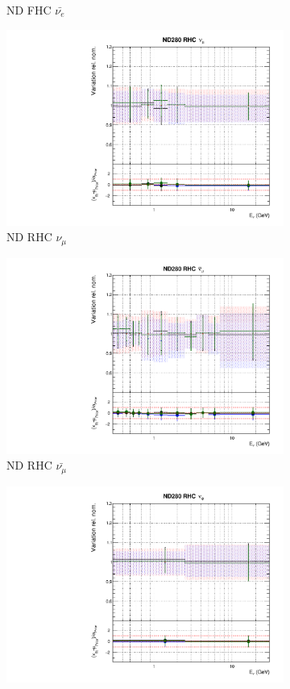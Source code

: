 \begin{figure}
\begin{subfigure}{0.45\textwidth}
  \caption{ND FHC $\bar{\nu_{e}}$}
\end{subfigure}
\begin{subfigure}{0.45\textwidth}
  \centering
  \includegraphics[width=0.75\linewidth]{figs/hptpcfitsflux_4}
  \caption{ND RHC $\nu_{\mu}$}
\end{subfigure}
\begin{subfigure}{0.45\textwidth}
  \centering
  \includegraphics[width=0.75\linewidth]{figs/hptpcfitsflux_5}
  \caption{ND RHC $\bar{\nu_{\mu}}$}
\end{subfigure}
\begin{subfigure}{0.45\textwidth}
  \centering
  \includegraphics[width=0.75\linewidth]{figs/hptpcfitsflux_6}

\end{subfigure}
\end{figure}
